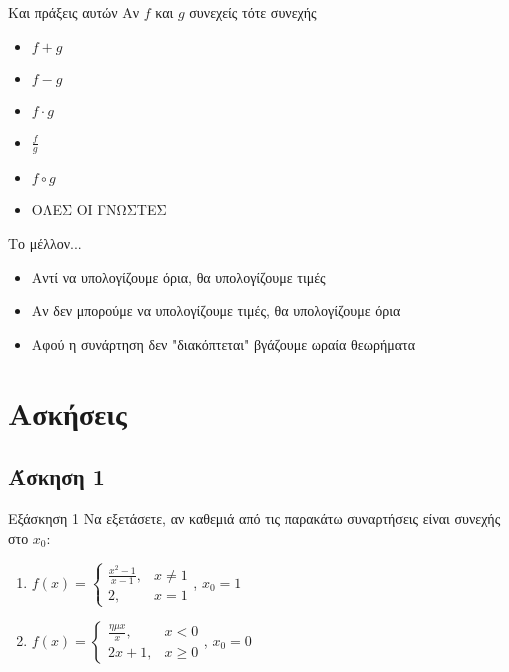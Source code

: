 \documentclass[greek]{beamer}
\begin{document}
\begin{frame}{Και πράξεις αυτών}
 Αν $f$ και $g$ συνεχείς τότε συνεχής
 \begin{itemize}
  \item $f+g$ \pause
  \item $f-g$ \pause
  \item $f\cdot g$ \pause
  \item $\frac{f}{g}$ \pause
  \item $f\circ g$ \pause
  \item ΟΛΕΣ ΟΙ ΓΝΩΣΤΕΣ
 \end{itemize}
\end{frame}

\begin{frame}{Το μέλλον...}
 \begin{itemize}
  \item Αντί να υπολογίζουμε όρια, θα υπολογίζουμε τιμές \pause
  \item Αν δεν μπορούμε να υπολογίζουμε τιμές, θα υπολογίζουμε όρια \pause
  \item Αφού η συνάρτηση δεν "διακόπτεται" βγάζουμε ωραία θεωρήματα
 \end{itemize}
\end{frame}

\section{Ασκήσεις}
\subsection{Άσκηση 1}
\begin{frame}[label=Άσκηση1]{Εξάσκηση 1}
 Να εξετάσετε, αν καθεμιά από τις παρακάτω συναρτήσεις είναι συνεχής στο $x_0$:
 \begin{enumerate}
  \item $f(x)=\begin{cases}
          \frac{x^2-1}{x-1}, & x\ne 1 \\
          2,                 & x=1
         \end{cases}$, $x_0=1$ \pause
  \item $f(x)=\begin{cases}
          \frac{ημx}{x}, & x<0    \\
          2x+1,          & x\ge 0
         \end{cases}$, $x_0=0$
 \end{enumerate}

\end{frame}
\end{document}
